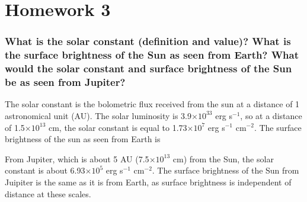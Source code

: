 \documentclass[12pt]{article}
\begin{document}


\section*{Homework 3}
\subsubsection*{What is the solar constant (definition and value)?
    What is the surface brightness of the Sun as seen from Earth?
    What would the solar constant and surface brightness of the Sun
    be as seen from Jupiter?}

    The solar constant is the bolometric flux received from the sun at a
    distance of 1 astronomical unit (AU)\cite{kuhn}.
    The solar luminosity is 3.9$\times10^{33}$ erg s$^{-1}$, so at a distance of
    1.5$\times10^{13}$ cm, the solar constant is equal to
    1.73$\times10^7$ erg s$^{-1}$ cm$^{-2}$. The surface brightness of the
    sun as seen from Earth is

    From Jupiter, which is about 5 AU (7.5$\times10^{13}$ cm) from the Sun,
    the solar constant is about 6.93$\times10^5$ erg s$^{-1}$ cm$^{-2}$.
    The surface brightness of the Sun from Juipiter
    is the same as it is from Earth, as
    surface brightness is independent of distance at these scales.


\end{document}
